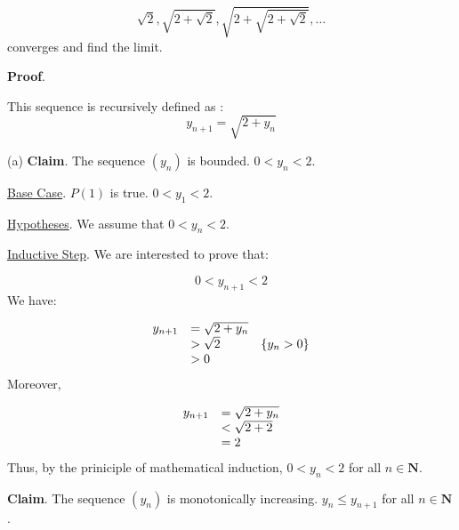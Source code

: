 \documentclass[10pt]{article}
\begin{document}
\begin{equation*}
\sqrt{2} ,\sqrt{2+\sqrt{2}} ,\sqrt{2+\sqrt{2+\sqrt{2}}} ,\dotsc 
\end{equation*}
 converges and find the limit.



\textbf{Proof}.



This sequence is recursively defined as :
\begin{equation*}
y_{n+1} =\sqrt{2+y_{n}}
\end{equation*}


(a) \textbf{Claim}. The sequence $\displaystyle ( y_{n})$ is bounded. $\displaystyle 0< y_{n} < 2$. 



\underline{Base Case}. $\displaystyle P( 1)$ is true. $\displaystyle 0< y_{1} < 2$.



\underline{Hypotheses}. We assume that $\displaystyle 0< y_{n} < 2$.



\underline{Inductive Step}. We are interested to prove that:


\begin{equation*}
0< y_{n+1} < 2
\end{equation*}
We have:


\begin{equation*}
\begin{array}{ c l c }
y_{n+1} & =\sqrt{2+y_{n}} & \\
 &  >\sqrt{2} & \{y_{n}  >0\}\\
 &  >0 & 
\end{array}
\end{equation*}
Moreover,


\begin{equation*}
\begin{array}{ c l }
y_{n+1} & =\sqrt{2+y_{n}}\\
 & < \sqrt{2+2}\\
 & =2
\end{array}
\end{equation*}
Thus, by the priniciple of mathematical induction, $\displaystyle 0< y_{n} < 2$ for all $\displaystyle n\in \mathbf{N}$.



\textbf{Claim}. The sequence $\displaystyle ( y_{n})$ is monotonically increasing. $\displaystyle y_{n} \leq y_{n+1}$ for all $\displaystyle n\in \mathbf{N}$.
\end{document}
